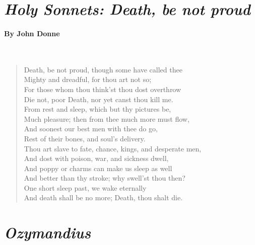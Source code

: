 \newpage
{}
\section*{\emph{Holy Sonnets: Death, be not proud}}
\paragraph{By John Donne}~
\begin{verse}
	Death, be not proud, though some have called thee\\
	Mighty and dreadful, for thou art not so;\\
	For those whom thou think'st thou dost overthrow\\
	Die not, poor Death, nor yet canst thou kill me.\\
	From rest and sleep, which but thy pictures be,\\
	Much pleasure; then from thee much more must flow,\\
	And soonest our best men with thee do go,\\
	Rest of their bones, and soul's delivery.\\
	Thou art slave to fate, chance, kings, and desperate men,\\
	And dost with poison, war, and sickness dwell,\\
	And poppy or charms can make us sleep as well\\
	And better than thy stroke; why swell'st thou then?\\
	One short sleep past, we wake eternally\\
	And death shall be no more; Death, thou shalt die.
\end{verse}

\newpage
\section*{\emph{Ozymandius}}
